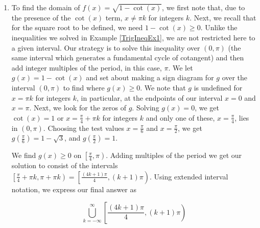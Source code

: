 {\begin{enumerate}
A second approach to the problem exploits the periodic nature of $f$.  Since $\cos(x)$ and $\sin(x)$ have period $2\pi$, it's not too difficult to show the function $f$ repeats itself every $2\pi$ units. (This doesn't necessarily mean the period of $f$ is $2\pi$.  The tangent function is comprised of $\cos(x)$ and $\sin(x)$, but its period is half theirs.  The reader is invited to investigate the period of $f$.)  This means if we can find a formula for the domain on an interval of length $2\pi$, we can express the entire domain by translating our answer left and right on the $x$-axis by adding integer multiples of $2\pi$. One such interval that arises from our domain work is  $\left[\frac{\pi}{3}, \frac{7\pi}{3}\right]$. The portion of the domain here is  $\left(\frac{\pi}{3}, \frac{5\pi}{3}\right) \cup \left(\frac{5\pi}{3}, \frac{7\pi}{3}\right)$.  Adding integer multiples of $2\pi$, we get the family of intervals  $\left(\frac{\pi}{3} + 2\pi k, \frac{5\pi}{3} + 2\pi k \right) \cup \left(\frac{5\pi}{3} + 2\pi k, \frac{7\pi}{3} + 2\pi k\right)$ for integers $k$.  We leave it to the reader to show that getting common denominators leads to our previous answer.


\item  To find the domain of $f(x) = \sqrt{1-\cot(x)}$, we first note that, due to the presence of the $\cot(x)$ term, $x \neq \pi k$ for integers $k$.  Next, we recall that for the square root to be defined, we need $1 - \cot(x) \geq 0$.  Unlike the inequalities we solved in Example \ref{TrigIneqEx1}, we are not restricted here to a given interval.  Our strategy is to solve this inequality over $(0,\pi)$  (the same interval which generates a fundamental cycle of cotangent) and then add integer multiples of the period, in this case, $\pi$.  We let $g(x) = 1 - \cot(x)$ and set about making a sign diagram for $g$ over the interval $(0,\pi)$ to find where $g(x) \geq 0$.  We note that $g$ is undefined for $x = \pi k$ for integers $k$, in particular, at the endpoints of our interval $x = 0$ and $x = \pi$. Next, we look for the zeros of $g$.  Solving $g(x) = 0$, we get $\cot(x) = 1$ or $x = \frac{\pi}{4} + \pi k$ for integers $k$ and only one of these, $x = \frac{\pi}{4}$, lies in $(0,\pi)$.   Choosing the test values $x = \frac{\pi}{6}$ and $x = \frac{\pi}{2}$, we get $g\left(\frac{\pi}{6}\right) = 1 - \sqrt{3}$, and $g\left(\frac{\pi}{2}\right) = 1$.  

\begin{center}
\end{center}

We find $g(x) \geq 0$ on $\left[\frac{\pi}{4}, \pi \right)$.  Adding multiples of the period we get our solution to consist of the intervals  $\left[\frac{\pi}{4} + \pi k, \pi + \pi k  \right) = \left[\frac{(4k+1)\pi}{4}, (k+1)\pi \right)$.  Using extended interval notation, we express our final answer as

\[\bigcup_{k = -\infty}^{\infty} \left[\dfrac{(4k+1)\pi}{4}, (k+1)\pi \right)\]



\end{enumerate}
}

